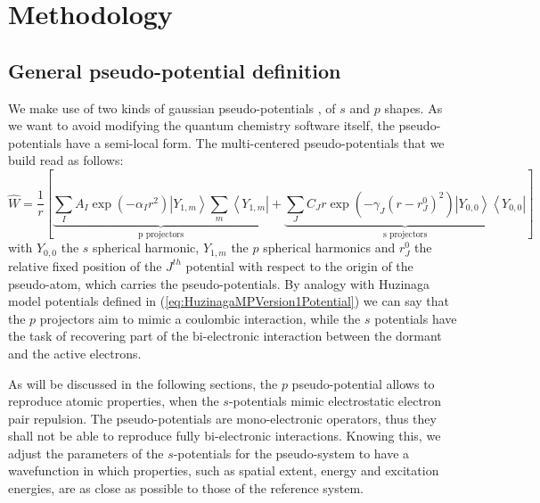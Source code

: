 \documentclass[aip]{revtex4-1}
\begin{document}
\section{Methodology}

\subsection{General pseudo-potential definition}

We make use of two kinds of gaussian pseudo-potentials \cite{me_structure_theory}, of \(s\) and \(p\) shapes. As we want to avoid modifying the quantum chemistry software itself, the pseudo-potentials have a semi-local form.
The multi-centered pseudo-potentials that we build read as follows:
\begin{equation}
\label{eq:ourPP}
\hat{W} = \frac{1}{r}\left[%
\underbrace{\sum_IA_I\exp(-\alpha_I r^2)\left|Y_{1,m}\right>\sum_m\left<Y_{1,m}\right|}_{\text{p projectors}}%
+%
\underbrace{\sum_JC_Jr\exp(-\gamma_J (r-r^0_J)^2)\left|Y_{0,0}\right>\left<Y_{0,0}\right|}_{\text{s projectors}}%
\right]
\end{equation}
with $Y_{0,0}$ the $s$ spherical harmonic, $Y_{1,m}$ the $p$ spherical harmonics
and $r^0_J$ the relative fixed position of the $J^{th}$
potential with respect to the origin of the pseudo-atom, which carries the pseudo-potentials.
By analogy with Huzinaga model potentials defined in (\ref{eq:HuzinagaMPVersion1Potential})
we can say that the $p$ projectors aim to mimic a coulombic interaction,
while the $s$ potentials have the task of recovering part of the bi-electronic interaction
between the dormant and the active electrons.

As will be discussed in the following sections,
the \(p\) pseudo-potential allows to reproduce atomic properties, when the
\(s\)-potentials mimic electrostatic electron pair repulsion. The pseudo-potentials are mono-electronic operators, thus they shall not be able to reproduce fully bi-electronic interactions. Knowing this, we adjust the parameters of the \(s\)-potentials for the pseudo-system to have a wavefunction in which properties, such as spatial extent, energy and excitation energies, are as close as possible to those of the reference system.
\end{document}
